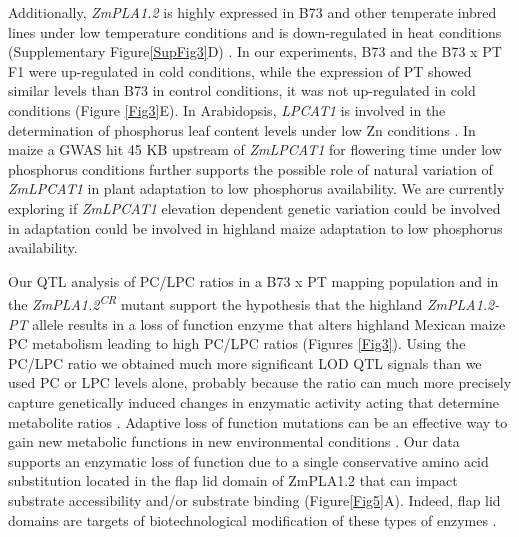 \documentclass[9pt,twocolumn,twoside,lineno]{BioRxiv}
\begin{document}
Additionally, \textit{ZmPLA1.2} is highly expressed in B73 and other temperate inbred lines under low temperature conditions and is down-regulated in heat conditions (Supplementary Figure\ref{SupFig3}D) \cite{Waters2017-nat}.
In our experiments, B73 and the B73 x PT F1 were up-regulated in cold conditions, while the expression of PT showed similar levels than B73 in control conditions, it was not up-regulated in cold conditions (Figure \ref{Fig3}E).
In Arabidopsis, \textit{LPCAT1} is involved in the determination of phosphorus leaf content levels under low Zn conditions \cite{Kisko2018-zm}.
In maize a GWAS hit 45 KB upstream of \textit{ZmLPCAT1} for flowering time under low phosphorus conditions further supports the possible role of natural variation of \textit{ZmLPCAT1} in plant adaptation to low phosphorus availability. 
We are currently exploring if \textit{ZmLPCAT1} elevation dependent genetic variation could be involved in adaptation could be involved in highland maize adaptation to low phosphorus availability.

Our QTL analysis of PC/LPC ratios in a B73 x PT mapping population and in the \textit{ZmPLA1.2\textsuperscript{CR}} mutant support the hypothesis that the highland \textit{ZmPLA1.2-PT} allele results in a loss of function enzyme that alters highland Mexican maize PC metabolism leading to high PC/LPC ratios (Figures \ref{Fig3}). 
Using the PC/LPC ratio we obtained much more significant LOD QTL signals than we used PC or LPC levels alone, probably because the ratio can much more precisely capture genetically induced changes in enzymatic activity acting that determine metabolite ratios \cite{Petersen2012-ii}.
Adaptive loss of function mutations can be an effective way to gain new metabolic functions in new environmental conditions \cite{Hottes2013-np}. 
Our data supports an enzymatic loss of function due to a single conservative amino acid substitution located in the flap lid domain of ZmPLA1.2 that can impact substrate  accessibility and/or substrate binding (Figure\ref{Fig5}A). 
Indeed, flap lid domains are targets of biotechnological modification of these types of enzymes \cite{Khan2017-ua}.
\end{document}
